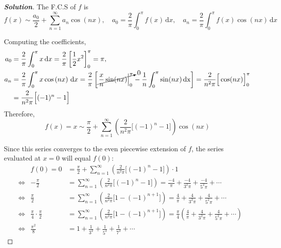 \documentclass[a4paper,12pt]{article} %
\theoremstyle{plain}
\begin{document}
\begin{proof}[\textbf{Solution}]
    The F.C.S of $f$ is \begin{equation*}
        f(x) \sim \frac{a_0}2 + \sum_{n=1}^\infty a_n \cos \left(nx\right),
        \quad 
        a_0 = \frac{2}{\pi} \int_0^\pi f(x) \, \mathrm dx, \quad
        a_n = \frac{2}{\pi} \int_0^\pi f(x) \cos \left(nx\right) \, \mathrm dx
    \end{equation*}
    
    Computing the coefficients,
    \begin{align*}
        a_0 &= \frac{2}{\pi} \int_0^\pi x \, \mathrm dx = \frac{2}{\pi} \left[ \frac{1}{2}x^2\right]_0^\pi = \pi,\\
        a_n &= \frac{2}{\pi} \int_0^\pi x \cos \left(nx\right) \, \mathrm dx
            = \frac{2}{\pi}\left[\cancelto{0}{\left.\frac{x}{n}\sin(nx)\right|_0^\pi} - \frac{1}{n}\int_0^\pi \sin(nx) \, \mathrm{dx}\right]
            = \frac{2}{n^2 \pi}\Big[\cos(nx)\Big]_0^\pi \\
           &=\frac{2}{n^2 \pi}\Big[(-1)^n - 1\Big]
    \end{align*}
    Therefore, 
    \begin{equation*}
        f(x) = x \sim  \frac{\pi}{2} + \sum_{n=1}^\infty \left(\frac{2}{n^2 \pi}\Big[(-1)^n - 1\Big]\right)\cos(nx)
    \end{equation*}
    
    Since this series converges to the even piecewise extension of $f$, the series evaluated at $x=0$ will equal $f(0)$:
    \begin{align*}
    &&f(0) = 0&= \frac{\pi}{2} + \sum_{n=1}^\infty \left(\frac{2}{n^2 \pi}\Big[(-1)^n - 1\Big]\right) \cdot 1 \\
     &\iff& -\frac{\pi}{2}&=\sum_{n=1}^\infty \left(\frac{2}{n^2 \pi}\Big[(-1)^{n}-1\Big]\right) = \frac{-4}{\pi} + \frac{-4}{3^2\pi} + \frac{-4}{5^2 \pi} + \cdots\\
    &\iff& \frac{\pi}{2}&=\sum_{n=1}^\infty \left(\frac{2}{n^2 \pi}\Big[1-(-1)^{n+1}\Big]\right) = \frac{4}{\pi} + \frac{4}{3^2\pi} + \frac{4}{5^2 \pi} + \cdots\\
    &\iff& \frac{\pi}{4}\cdot\frac{\pi}{2}&=\sum_{n=1}^\infty \left(\frac{2}{n^2 \pi}\Big[1-(-1)^{n+1}\Big]\right) = \frac{\pi}{4}\left(\frac{4}{\pi} + \frac{4}{3^2\pi} + \frac{4}{5^2 \pi} + \cdots\right)\\ 
    &\iff& \boxed{\frac{\pi^2}{8}} &= 1 + \frac{1}{3^2} + \frac{1}{5^2} + \frac{1}{7^2}+\cdots
    \end{align*}
    
\end{proof}
\end{document}

